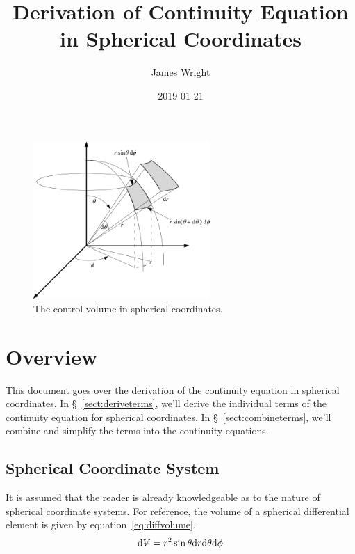 \documentclass[12pt, letterpaper, twoside]{article}
\title{Derivation of Continuity Equation in Spherical Coordinates}
\author{James Wright}
\date{2019-01-21}
\makeatletter
\DeclareRobustCommand{\volume}{\text{\volumedash}V}
\newcommand{\volumedash}{%
  \makebox[0pt][l]{%
    \ooalign{\hfil\hphantom{$\m@th V$}\hfil\cr\kern0.08em--\hfil\cr}%
  }%
}
\makeatother
\begin{document}
\maketitle

\begin{figure}[h]
    \centering
    \includegraphics[width=0.6\textwidth]{images/control-volume-spherical.png}
    \caption[caption with FN]{The control volume in spherical coordinates.\footnotemark}
    \label{fig:controlvolume}
\end{figure}

\section{Overview}
This document goes over the derivation of the continuity equation in spherical coordinates. 
In \S~\ref{sect:deriveterms}, we'll derive the individual terms of the continuity equation for spherical coordinates.
In \S~\ref{sect:combineterms}, we'll combine and simplify the terms into the continuity equations.

\subsection{Spherical Coordinate System}
    It is assumed that the reader is already knowledgeable as to the nature of spherical coordinate systems.
    For reference, the volume of a spherical differential element is given by equation~\ref{eq:diffvolume}.
    \begin{equation}
        \textrm{d}\volume = r^2 \sin \theta \textrm{d}r \textrm{d}\theta \textrm{d}\phi
        \label{eq:diffvolume}
    \end{equation}
\end{document}
